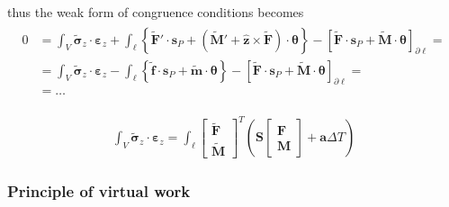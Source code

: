 \documentclass[letterpaper,10pt,english]{jupyterBook}
\begin{document}
\sphinxAtStartPar
thus the weak form of congruence conditions becomes
\begin{equation*}
\begin{split}\begin{aligned}
  0 
  & = \int_{V} \widetilde{\boldsymbol{\sigma}}_z \cdot \boldsymbol\varepsilon_z + \int_{\ell} \left\{ \widetilde{\mathbf{F}}' \cdot \mathbf{s}_P + \left( \widetilde{\mathbf{M}}' + \hat{\mathbf{z}} \times \widetilde{\mathbf{F}} \right) \cdot \boldsymbol\theta \right\} - \left[ \widetilde{\mathbf{F}} \cdot \mathbf{s}_P + \widetilde{\mathbf{M}} \cdot \boldsymbol\theta \right]_{\partial \ell} = \\
  & = \int_{V} \widetilde{\boldsymbol{\sigma}}_z \cdot \boldsymbol\varepsilon_z - \int_{\ell} \left\{ \widetilde{\mathbf{f}} \cdot \mathbf{s}_P + \widetilde{\mathbf{m}} \cdot \boldsymbol\theta \right\} - \left[ \widetilde{\mathbf{F}} \cdot \mathbf{s}_P + \widetilde{\mathbf{M}} \cdot \boldsymbol\theta \right]_{\partial \ell} = \\
  & = \dots
\end{aligned}\end{split}
\end{equation*}
\sphinxAtStartPar
{} 

\sphinxAtStartPar
{} 
\begin{equation*}
\begin{split}\int_V \widetilde{\boldsymbol{\sigma}}_z \cdot \boldsymbol\varepsilon_z = \int_{\ell} \begin{bmatrix} \widetilde{\mathbf{F}} \\ \widetilde{\mathbf{M}} \end{bmatrix}^T \left( \mathbf{S} \begin{bmatrix} \mathbf{F} \\ \mathbf{M} \end{bmatrix} + \mathbf{a} \Delta T \right)\end{split}
\end{equation*}

\subsubsection{Principle of virtual work}
\label{\detokenize{ch/solids/small-displacements-statics-beams-weak-form-general:principle-of-virtual-work}}\label{\detokenize{ch/solids/small-displacements-statics-beams-weak-form-general:solid-mechanics-intro-small-displacements-statics-beam-weak-form-weak-pvw}}
\sphinxAtStartPar
{}
\end{document}
